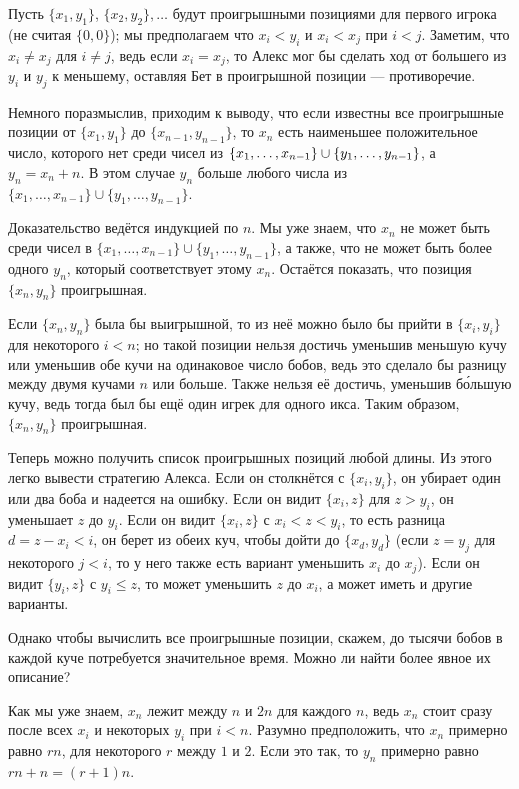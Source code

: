 Пусть $\{x_1 , y_1\}$, $\{x_2 , y_2\},\dots$ будут проигрышными позициями для первого игрока (не считая $\{0, 0\}$);
мы предполагаем что $x_i < y_i$ и $x_i < x_j$ при $i < j$.
Заметим, что $x_i \ne x_j$ для $i \ne j$, ведь если $x_i = x_j$, то Алекс мог бы сделать ход от большего из $y_i$ и $y_j$ к меньшему, оставляя Бет в проигрышной позиции --- противоречие.

Немного поразмыслив, приходим к выводу, что если известны все проигрышные позиции от $\{x_1 , y_1\}$ до $\{x_{n-1}, y_{n-1}\}$, то $x_n$ есть наименьшее положительное число, которого нет среди чисел из $\{x_1, \dots , x_{n-1}\} \z\cup \{y_1, \dots , y_{n-1}\}$, а $y_n = x_n + n$.
В этом случае $y_n$ больше любого числа из $\{x_1, \dots , x_{n-1}\} \cup \{y_1, \dots , y_{n-1}\}$.

Доказательство ведётся индукцией по $n$.
Мы уже знаем, что $x_n$ не может быть среди чисел в $\{x_1, \dots , x_{n-1}\} \cup \{y_1, \dots , y_{n-1}\}$, а также, что не может быть более одного $y_n$, который соответствует этому $x_n$.
Остаётся показать, что позиция $\{x_n, y_n\}$ проигрышная.

Если $\{x_n, y_n\}$ была бы выигрышной, то из неё можно было бы прийти в $\{x_i, y_i\}$ для некоторого $i < n$; но такой позиции нельзя достичь уменьшив меньшую кучу или уменьшив обе кучи на одинаковое число бобов, ведь это сделало бы разницу между двумя кучами $n$ или больше.
Также нельзя её достичь, уменьшив б\'{о}льшую кучу, ведь тогда был бы ещё один игрек для одного икса.
Таким образом, $\{x_n, y_n\}$ проигрышная.

Теперь можно получить список проигрышных позиций любой длины.
Из этого легко вывести стратегию Алекса.
Если он столкнётся с $\{x_i , y_i\}$, он убирает один или два боба и надеется на ошибку.
Если он видит $\{x_i , z\}$ для $z > y_i$, он уменьшает $z$ до $y_i$.
Если он видит $\{x_i , z\}$ с $x_i < z < y_i$, то есть разница $d = z - x_i < i$, он берет из обеих куч, чтобы дойти до $\{x_d , y_d\}$ (если $z = y_j$ для некоторого $j < i$, то у него также есть вариант уменьшить $x_i$ до $x_j$).
Если он видит $\{y_i , z\}$ с $y_i \le z$, то может уменьшить $z$ до $x_i$, а может иметь и другие варианты.


Однако чтобы вычислить все проигрышные позиции, скажем, до тысячи бобов в каждой куче потребуется значительное время.
Можно ли найти более явное их описание?

Как мы уже знаем, $x_n$ лежит между $n$ и $2n$ для каждого $n$, ведь $x_n$ стоит сразу после всех $x_i$ и некоторых $y_i$ при $i < n$.
Разумно предположить, что $x_n$ примерно равно $rn$, для некоторого $r$ между $1$ и $2$.
Если это так, то $y_n$ примерно равно $rn + n = (r + 1)n$.

